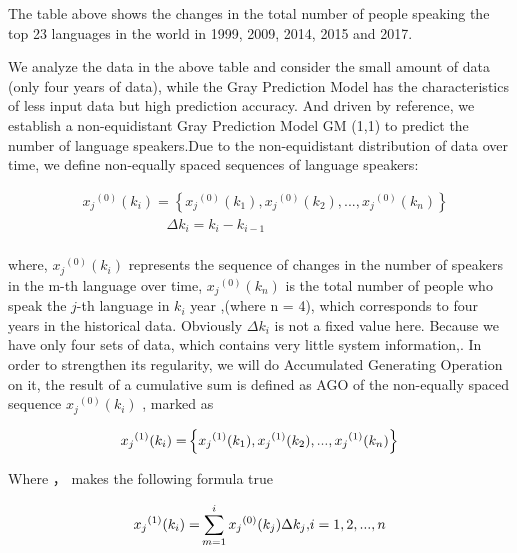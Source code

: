  The table above shows the changes in the total number of people speaking the top 23 languages in the world in 1999, 2009, 2014, 2015 and 2017.
 
 We analyze the data in the above table and consider the small amount of data (only four years of data), while the Gray Prediction Model has the characteristics of less input data but high prediction accuracy. And driven by reference, we establish a non-equidistant Gray Prediction Model GM (1,1) to predict the number of language speakers.Due to the non-equidistant distribution of data over time, we define non-equally spaced sequences of language speakers:



\begin{equation}
\begin{aligned}
& {x_j}^{(0)}({k_i}) = \left\{ {{x_j}^{(0)}({k_1}),{x_j}^{(0)}({k_2}),...,{x_j}^{(0)}({k_n})} \right\} \\
& \qquad \qquad \qquad \Delta {k_i} = {k_i} - {k_{i - 1}} \\
\end{aligned}
\end{equation}

\par where, ${x_j}^{(0)}({k_i})$ represents the sequence of changes in the number of speakers in the m-th language over time, ${x_j}^{(0)}({k_n})$  is the total number of people who speak the $j$-th language in ${k_i}$ year ,(where n = 4), which corresponds to four years in the historical data. Obviously $\Delta {k_i}$  is not a fixed value here. Because we have only four sets of data, which contains very little system information,. In order to strengthen its regularity, we will do Accumulated Generating Operation on it, the result of a cumulative sum is defined as AGO of the non-equally spaced sequence ${x_j}^{(0)}({k_i})$ , marked as

\begin{equation}
{x_j}^{(1)}{\rm{(}}{k_i}{\rm{) = }}\left\{ {{x_j}^{(1)}({k_1}),{x_j}^{(1)}({k_2}),...,{x_j}^{(1)}({k_n})} \right\}\label{aa1}
\end{equation}

Where ，  makes the following formula true 

\begin{equation}
{x_j}^{(1)}{\rm{(}}{k_i}{\rm{) = }}\sum\limits_{m = 1}^i {{x_j}^{(0)}({k_j})\Delta {k_j}{\rm{ ,  }}} i = 1,2,...,n
\end{equation}

